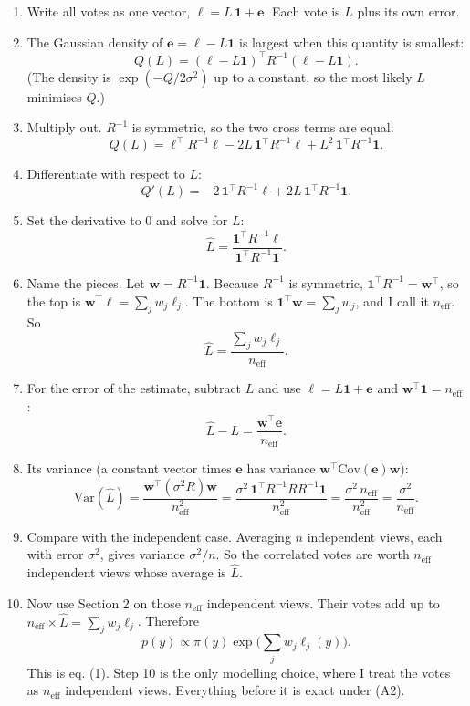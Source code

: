 \documentclass[11pt]{article}
\newcommand{\Var}{\mathrm{Var}}
\newcommand{\Cov}{\mathrm{Cov}}
\newcommand{\one}{\mathbf{1}}
\newcommand{\Steps}{\par\smallskip\noindent{\sffamily\bfseries\color{headblue}Steps.}\par}
\newenvironment{steps}{\begin{enumerate}[label=\textbf{\arabic*.},leftmargin=2em,itemsep=6pt]}{\end{enumerate}}
\begin{document}
\Steps
\begin{steps}
  \item Write all votes as one vector, $\bm\ell=L\,\one+\bm e$. Each vote is $L$ plus its own error.
  \item The Gaussian density of $\bm e=\bm\ell-L\one$ is largest when this quantity is smallest:
  \[ Q(L)=(\bm\ell-L\one)^\top R^{-1}(\bm\ell-L\one). \]
  (The density is $\exp(-Q/2\sigma^2)$ up to a constant, so the most likely $L$ minimises $Q$.)
  \item Multiply out. $R^{-1}$ is symmetric, so the two cross terms are equal:
  \[ Q(L)=\bm\ell^\top R^{-1}\bm\ell-2L\,\one^\top R^{-1}\bm\ell+L^2\,\one^\top R^{-1}\one. \]
  \item Differentiate with respect to $L$:
  \[ Q'(L)=-2\,\one^\top R^{-1}\bm\ell+2L\,\one^\top R^{-1}\one. \]
  \item Set the derivative to 0 and solve for $L$:
  \[ \hat L=\frac{\one^\top R^{-1}\bm\ell}{\one^\top R^{-1}\one}. \]
  \item Name the pieces. Let $\bm w=R^{-1}\one$. Because $R^{-1}$ is symmetric, $\one^\top R^{-1}=\bm w^\top$, so the top is $\bm w^\top\bm\ell=\sum_j w_j\ell_j$. The bottom is $\one^\top\bm w=\sum_jw_j$, and I call it $n_{\text{eff}}$. So
  \[ \hat L=\frac{\sum_jw_j\ell_j}{n_{\text{eff}}}. \]
  \item For the error of the estimate, subtract $L$ and use $\bm\ell=L\one+\bm e$ and $\bm w^\top\one=n_{\text{eff}}$:
  \[ \hat L-L=\frac{\bm w^\top\bm e}{n_{\text{eff}}}. \]
  \item Its variance (a constant vector times $\bm e$ has variance $\bm w^\top\Cov(\bm e)\bm w$):
  \[ \Var(\hat L)=\frac{\bm w^\top(\sigma^2R)\bm w}{n_{\text{eff}}^2}=\frac{\sigma^2\,\one^\top R^{-1}RR^{-1}\one}{n_{\text{eff}}^2}=\frac{\sigma^2\,n_{\text{eff}}}{n_{\text{eff}}^2}=\frac{\sigma^2}{n_{\text{eff}}}. \]
  \item Compare with the independent case. Averaging $n$ independent views, each with error $\sigma^2$, gives variance $\sigma^2/n$. So the correlated votes are worth $n_{\text{eff}}$ independent views whose average is $\hat L$.
  \item Now use Section 2 on those $n_{\text{eff}}$ independent views. Their votes add up to $n_{\text{eff}}\times\hat L=\sum_jw_j\ell_j$. Therefore
  \[ p(y)\propto\pi(y)\exp\Big(\sum_jw_j\ell_j(y)\Big). \]
  This is eq. (1). Step 10 is the only modelling choice, where I treat the votes as $n_{\text{eff}}$ independent views. Everything before it is exact under (A2).
\end{steps}
\end{document}
